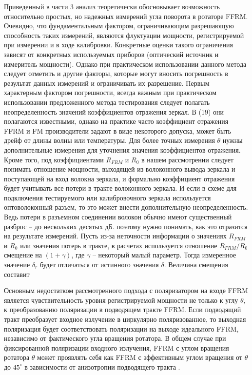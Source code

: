 \documentclass{article}
\begin{document}
Приведенный в части 3 анализ теоретически обосновывает возможность относительно простых, но надежных измерений угла поворота в ротаторе FFRM.
Очевидно, что фундаментальным фактором, ограничивающим разрешающую способность таких измерений, являются флуктуации мощности, регистрируемой при измерении и в ходе калибровки.
Конкретные оценки такого ограничения зависят от конкретных используемых приборов (оптический источник и измеритель мощности).
Однако при практическом использовании данного метода следует отметить и другие факторы, которые могут вносить погрешность в результат данных измерений и ограничивать их разрешение.   
Первым характерным фактором погрешности, всегда важным при практическом использовании предложенного метода тестирования следует полагать неопределенность значений коэффициентов отражения зеркал.
В (19) они полагаются известными, однако на практике часто коэффициент отражения FFRM и FM производители задают в виде некоторого допуска, может быть дрейф от длины волны или температуры.
Для более точных измерения $\theta$ нужны дополнительные измерения для уточнения значения коэффициентов отражения.
Кроме того, под коэффициентами $R_{FRM}$ и $R_0$ в нашем рассмотрении следует понимать отношение мощности, выходящей из волоконного вывода зеркала и поступающей на вход волокна зеркала, и формально коэффициент отражения будет учитывать все потери в тракте волоконного зеркала. И если в схеме для подключения тестируемого или калибровочного зеркала используется оптоволоконный разъем, то это может внести дополнительную неопределенность. Ведь потери в разъемном соединении волокон обычно имеют существенный разброс – до нескольких десятых дБ. поэтому нужно понимать, как это отразится на результате измерений. Пусть из-за неточности информации о значениях $R_{FRM}$ и $R_0$ или значения потерь в тракте, в расчетах используется отношение $R_{FRM}/R_0$ смещение на $(1+\gamma)$, где $\gamma$ – некоторый малый параметр. Тогда измеренное значение $\delta_r$ будет отличаться от истинного значения $\delta$. Величина смещения составит    























Основным недостатком рассмотренного подхода с поляризатором на входе FFRM является чувствительность уровня регистрируемой мощности не только к углу $\theta$, к преобразованию поляризации в подводящем тракте FFRM.
Если подводящий тракт преобразует входное излучение в циркулярно поляризованное, то  выходная поляризация будет соответствовать поляризации на выходе идеального FFRM, независимо от фактического угла вращения ротатора.
В общем случае при фиксированной поляризации входного излучения, FFRM с углом вращения ротатора $\theta$ может проявлять себя как FFRM с эффективным углом вращения от $\theta$ до $45^\circ$ в зависимости от анизотропии подводящего тракта \autocite{buchilkoAnalysisStatePolarization2024}.
\end{document}
